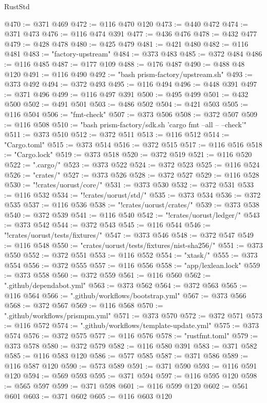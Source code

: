 \begin{lexlean}{RustStd}
\begin{coremodule}
@470 := @371 @469
@472 := @116 @470 @120
@473 := @440 @472
@474 := @371 @473
@476 := @116 @474 @391
@477 := @436 @476
@478 := @432 @477
@479 := @428 @478
@480 := @425 @479
@481 := @421 @480
@482 := @116 @481
@483 := "factory-upstream"
@484 := @373 @483
@485 := @372 @484
@486 := @116 @485
@487 := @177 @109
@488 := @176 @487
@490 := @488 @48 @120
@491 := @116 @490
@492 := "bash prism-factory/upstream.sh"
@493 := @373 @492
@494 := @372 @493
@495 := @116 @494
@496 := @448 @391
@497 := @371 @496
@499 := @116 @497 @391
@500 := @495 @499
@501 := @432 @500
@502 := @491 @501
@503 := @486 @502
@504 := @421 @503
@505 := @116 @504
@506 := "fmt-check"
@507 := @373 @506
@508 := @372 @507
@509 := @116 @508
@510 := "bash prism-factory/sdk.sh 'cargo fmt --all -- --check'"
@511 := @373 @510
@512 := @372 @511
@513 := @116 @512
@514 := "Cargo.toml"
@515 := @373 @514
@516 := @372 @515
@517 := @116 @516
@518 := "Cargo.lock"
@519 := @373 @518
@520 := @372 @519
@521 := @116 @520
@522 := ".cargo/"
@523 := @373 @522
@524 := @372 @523
@525 := @116 @524
@526 := "crates/"
@527 := @373 @526
@528 := @372 @527
@529 := @116 @528
@530 := "!crates/uorust/core/"
@531 := @373 @530
@532 := @372 @531
@533 := @116 @532
@534 := "!crates/uorust/std/"
@535 := @373 @534
@536 := @372 @535
@537 := @116 @536
@538 := "!crates/uorust/crates/"
@539 := @373 @538
@540 := @372 @539
@541 := @116 @540
@542 := "!crates/uorust/ledger/"
@543 := @373 @542
@544 := @372 @543
@545 := @116 @544
@546 := "!crates/uorust/tests/fixtures/"
@547 := @373 @546
@548 := @372 @547
@549 := @116 @548
@550 := "crates/uorust/tests/fixtures/nist-sha256/"
@551 := @373 @550
@552 := @372 @551
@553 := @116 @552
@554 := "xtask/"
@555 := @373 @554
@556 := @372 @555
@557 := @116 @556
@558 := "app/lexlean.lock"
@559 := @373 @558
@560 := @372 @559
@561 := @116 @560
@562 := ".github/dependabot.yml"
@563 := @373 @562
@564 := @372 @563
@565 := @116 @564
@566 := ".github/workflows/bootstrap.yml"
@567 := @373 @566
@568 := @372 @567
@569 := @116 @568
@570 := ".github/workflows/prismpm.yml"
@571 := @373 @570
@572 := @372 @571
@573 := @116 @572
@574 := ".github/workflows/template-update.yml"
@575 := @373 @574
@576 := @372 @575
@577 := @116 @576
@578 := "rustfmt.toml"
@579 := @373 @578
@580 := @372 @579
@582 := @116 @580 @391
@583 := @371 @582
@585 := @116 @583 @120
@586 := @577 @585
@587 := @371 @586
@589 := @116 @587 @120
@590 := @573 @589
@591 := @371 @590
@593 := @116 @591 @120
@594 := @569 @593
@595 := @371 @594
@597 := @116 @595 @120
@598 := @565 @597
@599 := @371 @598
@601 := @116 @599 @120
@602 := @561 @601
@603 := @371 @602
@605 := @116 @603 @120

\end{coremodule}
\end{lexlean}
